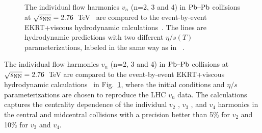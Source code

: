 \begin{figure}[h]
\begin{center}
        \caption{The individual flow harmonics $v_n$ (n=2, 3 and 4) in $\textnormal{Pb--Pb}$ collisions at $\sqrt{s_{\textnormal{NN}}}=2.76$~TeV~\cite{Adam:2016izf} are compared to the event-by-event EKRT+viscous hydrodynamic calculations~\cite{Niemi:2015qia}. The lines are hydrodynamic predictions with two different $\eta/s(T)$ parameterizations, labeled in the same way as in ~\cite{Niemi:2015qia}.}
        \label{fig:Figure_8}
              \end{center}
\end{figure}

The individual flow harmonics $v_n$ (n=2, 3 and 4) in $\textnormal{Pb--Pb}$ collisions at $\sqrt{s_{\textnormal{NN}}}=2.76$~TeV are compared to the event-by-event EKRT+viscous hydrodynamic calculations~\cite{Niemi:2015qia} in Fig.~\ref{fig:Figure_8}, where the initial conditions and $\eta/s$ parameterizations are chosen to reproduce the LHC $v_n$ data.
The calculations captures the centrality dependence of the individual $v_2$ , $v_3$ , and $v_4$ harmonics in the central and midcentral collisions with a precision better than 5\% for $v_2$ and 10\% for $v_3$ and $v_4$.

